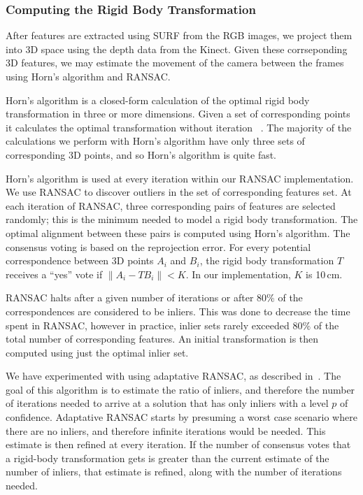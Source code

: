 \documentclass[letterpaper, 10pt, conference]{ieeeconf}
\begin{document}
\subsubsection{Computing the Rigid Body Transformation}
After features are extracted using SURF from the RGB images, we project
them into 3D space using the depth data from the Kinect. Given these
corrseponding 3D features, we may estimate the movement of the camera
between the frames using Horn's algorithm and RANSAC.

Horn's algorithm is a closed-form calculation of the optimal rigid body
transformation in three or more dimensions.  Given a set of corresponding
points it calculates the optimal transformation without iteration
~\cite{horn1987closed}.  The majority of the calculations we perform with
Horn's algorithm have only three sets of corresponding 3D points, and so
Horn's algorithm is quite fast.

Horn's algorithm is used at every iteration within our RANSAC implementation.
We use RANSAC to discover outliers in the set of corresponding features
set. At each iteration of RANSAC, three corresponding pairs of features
are selected randomly; this is the minimum needed to model a rigid body
transformation. The optimal alignment between these pairs is computed using
Horn's algorithm. The consensus voting is based on the reprojection error.
For every potential correspondence between 3D points $A_i$ and $B_i$,
the rigid body transformation $T$ receives a ``yes'' vote if
$\parallel A_i - TB_i \parallel < K$. In our implementation, $K$ is 10\,cm.

RANSAC halts after a given number of iterations or after $80\%$ of the
correspondences are considered to be inliers.  This was done to decrease
the time spent in RANSAC, however in practice, inlier sets rarely exceeded
$80\%$ of the total number of corresponding features.  An initial
transformation is then computed using just the optimal inlier set.

We have experimented with using adaptative RANSAC, as described in~\cite{Hartley2004}.
The goal of this algorithm is to estimate the ratio of inliers, and therefore the number
of iterations needed to arrive at a solution that has only inliers with a level $p$ of
confidence. Adaptative RANSAC starts by presuming a worst case scenario where
there are no inliers, and therefore infinite iterations would be needed. This estimate is
then refined at every iteration. If the number of consensus votes that a rigid-body
transformation gets is greater than the current estimate of the number of inliers,
that estimate is refined, along with the number of iterations needed.
\end{document}
